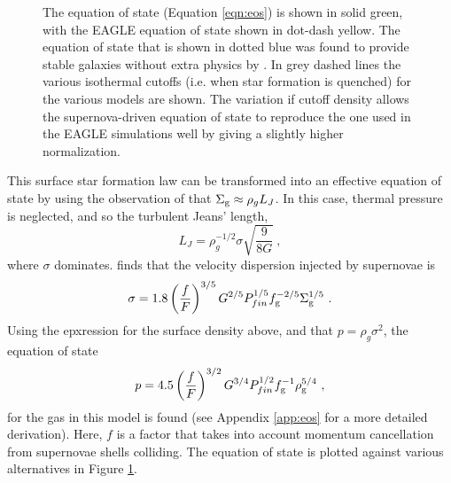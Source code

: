 \begin{figure}
    \leavevmode\rlap{\usebox{\graphicsbox}}
    \begin{minipage}[b]{0.42\wd\graphicsbox}
    {\caption{The equation of state (Equation \ref{eqn:eos}) is shown in solid green, with the EAGLE equation of state shown in dot-dash yellow. The equation of state that is shown in dotted blue was found to provide stable galaxies without extra physics by \citep{springel_cosmological_2003}. In grey dashed lines the various isothermal cutoffs (i.e. when star formation is quenched) for the various models are shown. The variation if cutoff density allows the supernova-driven equation of state to reproduce the one used in the EAGLE simulations well by giving a slightly higher normalization.}\label{fig:eos}}
\end{minipage}\hspace*{1\wd\graphicsbox}
\end{figure}

This surface star formation law can be transformed into an effective equation of state by using the observation of \citet{schaye_model-independent_2001} that $\Sigma_\mathrm{g} \approx \rho_g L_J$.
In this case, thermal pressure is neglected, and so the turbulent Jeans' length,
\begin{equation}
\label{eqn:jeans}
L_J = \rho_g^{-1/2} \sigma \sqrt{\frac{9}{8G}}~,
\end{equation}
where $\sigma$ dominates.
\citet{martizzi_supernova_2015} finds that the velocity dispersion injected by supernovae is
\begin{equation}
\label{eqn:martdisp}
\sigma = 1.8 \left(\frac{f}{F}\right)^{{3/5}} G^{{2/5}} P_{fin}^{{1/5}} f_\mathrm{g}^{{-2/5}} \Sigma_\mathrm{g}^{{1/5}}~.
\end{equation}
Using the epxression for the surface density above, and that $p = \rho_g \sigma^2$, the equation of state
\begin{equation}
\label{eqn:eos}
p = 4.5\left(\frac{f}{F}\right)^{{3/2}} G^{{3/4}} P_{fin}^{{1/2}} f_\mathrm{g}^{-1} \rho_\mathrm{g}^{{5/4}}~,
\end{equation}
for the gas in this model is found (see Appendix \ref{app:eos} for a more detailed derivation).
Here, $f$ is a factor that takes into account momentum cancellation from supernovae shells colliding.
The equation of state is plotted against various alternatives in Figure \ref{fig:eos}.
